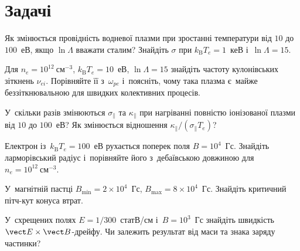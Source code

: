 \section*{Задачі}




\begin{problem}\label{prb:PlasmaConductivity}
	Як змінюється провідність водневої плазми при зростанні температури від $10$ до $100$~еВ,
	якщо $\ln\Lambda$ вважати сталим? Знайдіть $\sigma$ при $k_{\mathrm B}T_e=1$~кеВ
	і~$\ln\Lambda=15$.
\end{problem}

\begin{problem}\label{prb:PlasmaCollisions}
	Для $n_e=10^{12}~\mathrm{см}^{-3}$, $k_{\mathrm B}T_e=10$~еВ, $\ln\Lambda=15$ знайдіть
	частоту кулонівських зіткнень $\nu_{ei}$. Порівняйте її з~$\omega_{pe}$ і~поясніть, чому
	така плазма є~майже беззіткнювальною для швидких колективних процесів.
\end{problem}

\begin{problem}\label{prb:PlasmaThermal}
	У~скільки разів змінюються $\sigma_\parallel$ та $\kappa_\parallel$ при нагріванні
	повністю іонізованої плазми від $10$ до $100$~еВ? Як змінюється відношення
	$\kappa_\parallel/(\sigma_\parallel T_e)$?
\end{problem}

\begin{problem}\label{prb:PlasmaLarmor}
	Електрон із~$k_{\mathrm B}T_e=100$~еВ рухається поперек поля $B=10^4$~Гс. Знайдіть
	ларморівський радіус і~порівняйте його з~дебаївською довжиною для
	$n_e=10^{12}~\mathrm{см}^{-3}$.
\end{problem}

\begin{problem}\label{prb:PlasmaMirror}
	У~магнітній пастці $B_{\min}=2\times10^4$~Гс, $B_{\max}=8\times10^4$~Гс. Знайдіть
	критичний пітч-кут конуса втрат.
\end{problem}

\begin{problem}\label{prb:PlasmaExB}
	У~схрещених полях $E=1/300$~статВ/см і~$B=10^3$~Гс знайдіть швидкість $\vect E\times\vect
		B$-дрейфу. Чи залежить результат від маси та знака заряду частинки?
\end{problem}

